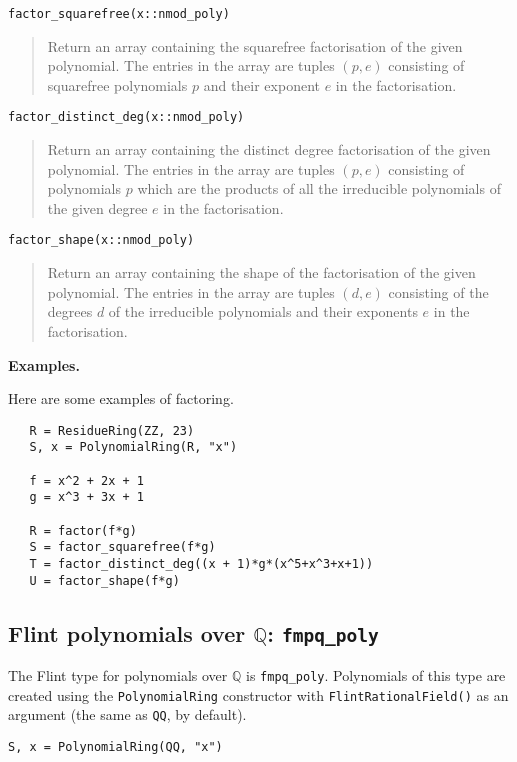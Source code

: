 \documentclass[a4paper,10pt]{article}
\newcommand{\Q}{\mathbb{Q}}
\newcommand{\code}{\lstinline}
\newcommand{\desc}[1]{\vspace{-3mm}\begin{quote}#1\end{quote}}
\begin{document}
{{\begin{lstlisting}
factor_squarefree(x::nmod_poly)
\end{lstlisting}

\desc{Return an array containing the squarefree factorisation of the given polynomial. The
entries in the array are tuples $(p, e)$ consisting of squarefree polynomials $p$ and their
exponent $e$ in the factorisation.}

\begin{lstlisting}
factor_distinct_deg(x::nmod_poly)
\end{lstlisting}

\desc{Return an array containing the distinct degree factorisation of the given polynomial.
The entries in the array are tuples $(p, e)$ consisting of polynomials $p$ which are the
products of all the irreducible polynomials of the given degree $e$ in the factorisation.}

\begin{lstlisting}
factor_shape(x::nmod_poly)
\end{lstlisting}

\desc{Return an array containing the shape of the factorisation of the given polynomial.
The entries in the array are tuples $(d, e)$ consisting of the degrees $d$ of the
irreducible polynomials and their exponents $e$ in the factorisation.}

\textbf{Examples.}

Here are some examples of factoring.

\begin{lstlisting}
   R = ResidueRing(ZZ, 23)
   S, x = PolynomialRing(R, "x")

   f = x^2 + 2x + 1
   g = x^3 + 3x + 1

   R = factor(f*g)
   S = factor_squarefree(f*g)
   T = factor_distinct_deg((x + 1)*g*(x^5+x^3+x+1))
   U = factor_shape(f*g)
\end{lstlisting}

\subsection{Flint polynomials over $\Q$: \code{fmpq_poly}}

The Flint type for polynomials over $\Q$ is \code{fmpq_poly}.
Polynomials of this type are created using the \code{PolynomialRing} constructor with
\code{FlintRationalField()} as an argument (the same as \code{QQ}, by default).  

\begin{lstlisting}
S, x = PolynomialRing(QQ, "x")
\end{lstlisting}

}}
\end{document}
